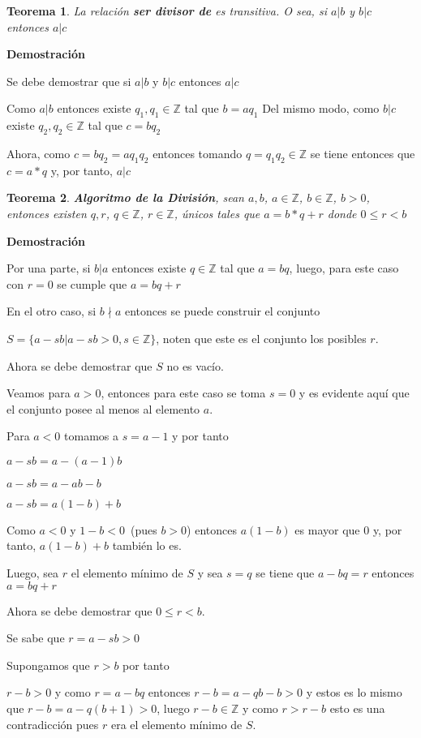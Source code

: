 \documentclass[a4paper,1pt]{report}
\newtheorem*{teo}{Teorema}
\begin{document}
\begin{teo}
 La relación \textbf{ser divisor de} es transitiva. O sea, si $a|b$ y $b|c$ entonces $a|c$
\end{teo}

\textbf{Demostración}

Se debe demostrar que si $a|b$ y $b|c$ entonces $a|c$

Como $a|b$ entonces existe $q_1, q_1\in\mathbb{Z}$ tal que $b=aq_1$
Del mismo modo, como $b|c$ existe $q_2, q_2\in\mathbb{Z}$ tal que $c=bq_2$

Ahora, como $c=bq_2=aq_1q_2$ entonces tomando $q=q_1q_2\in\mathbb{Z}$ se tiene entonces que $c=a*q$ y, por tanto, $a|c$ 

\begin{teo}
 \textbf{Algoritmo de la División}, sean $a,b$, $a\in\mathbb{Z}$, $b\in\mathbb{Z}$, $b > 0$, entonces existen $q,r$, $q\in\mathbb{Z}$, $r\in\mathbb{Z}$, únicos tales que $a = b*q+r$ donde $0\leq r < b$
\end{teo}

\textbf{Demostración}

Por una parte, si $b|a$ entonces existe $q\in\mathbb{Z}$ tal que $a=bq$, luego, para este caso con $r=0$ se cumple que $a=bq+r$

En el otro caso, si $b\nmid a$ entonces se puede construir el conjunto 

$S=\{a-sb|a-sb>0, s\in\mathbb{Z}\}$, noten que este es el conjunto los posibles $r$.

Ahora se debe demostrar que $S$ no es vacío.

Veamos para $a>0$, entonces para este caso se toma $s=0$ y es evidente aquí que el conjunto posee al menos al elemento $a$.

Para $a<0$ tomamos a $s=a-1$ y por tanto

$a-sb=a-(a-1)b$

$a-sb=a-ab-b$

$a-sb=a(1-b)+b$

Como $a<0$ y $1-b<0$~(pues $b>0$) entonces $a(1-b)$ es mayor que 0 y, por tanto, $a(1-b)+b$ también lo es.

Luego, sea $r$ el elemento mínimo de $S$ y sea $s=q$ se tiene que $a-bq=r$ entonces $a=bq+r$

Ahora se debe demostrar que $0\leq r < b$.

Se sabe que $r=a-sb>0$

Supongamos que $r>b$ por tanto

$r-b>0$ y como $r=a-bq$ entonces $r-b=a-qb-b>0$ y estos es lo mismo que $r-b=a-q(b+1)>0$, luego $r-b\in\mathbb{Z}$ y como $r>r-b$ esto es una contradicción pues $r$ era el elemento mínimo de $S$.
\end{document}
